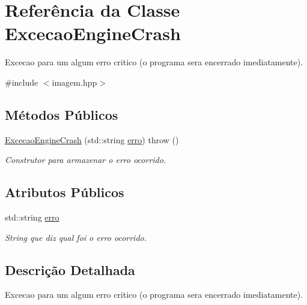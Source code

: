 \hypertarget{classExcecaoEngineCrash}{
\section{Referência da Classe ExcecaoEngineCrash}
\label{classExcecaoEngineCrash}
}


Excecao para um algum erro critico (o programa sera encerrado imediatamente).  




{\ttfamily \#include $<$imagem.hpp$>$}

\subsection*{Métodos Públicos}
\begin{DoxyCompactItemize}
\item 
\hyperlink{classExcecaoEngineCrash_a60622b0f6bc17efcde24206ed705eb98}{ExcecaoEngineCrash} (std::string \hyperlink{classExcecaoEngineCrash_a54792cee90769059065a7144d7ed4d26}{erro})  throw ()
\begin{DoxyCompactList}\small\item\em Construtor para armazenar o erro ocorrido. \item\end{DoxyCompactList}\end{DoxyCompactItemize}
\subsection*{Atributos Públicos}
\begin{DoxyCompactItemize}
\item 
\hypertarget{classExcecaoEngineCrash_a54792cee90769059065a7144d7ed4d26}{
std::string \hyperlink{classExcecaoEngineCrash_a54792cee90769059065a7144d7ed4d26}{erro}}
\label{classExcecaoEngineCrash_a54792cee90769059065a7144d7ed4d26}

\begin{DoxyCompactList}\small\item\em String que diz qual foi o erro ocorrido. \item\end{DoxyCompactList}\end{DoxyCompactItemize}


\subsection{Descrição Detalhada}
Excecao para um algum erro critico (o programa sera encerrado imediatamente). 

